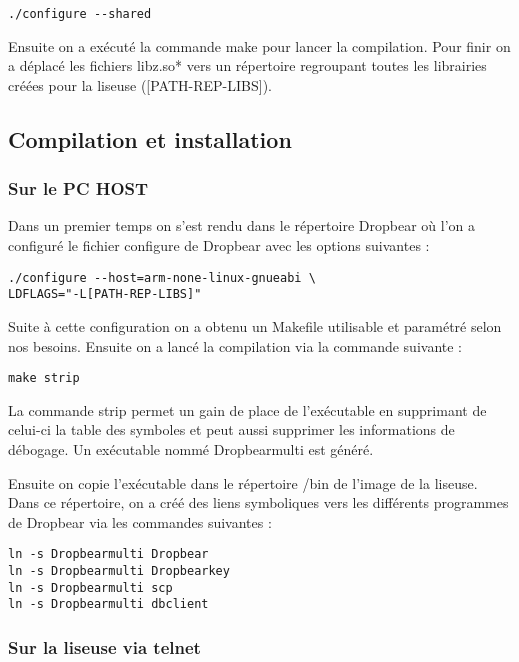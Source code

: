 \begin{lstlisting}
./configure --shared
\end{lstlisting}

Ensuite on a exécuté la commande make pour lancer la compilation.
Pour finir on a déplacé les fichiers libz.so* vers un répertoire regroupant toutes les librairies créées pour la liseuse ([PATH-REP-LIBS]). 

\subsection{Compilation et installation}

\subsubsection{Sur le PC HOST}

Dans un premier temps on s'est rendu dans le répertoire Dropbear où l'on a configuré le fichier configure de Dropbear avec les options suivantes :

\begin{lstlisting}
./configure --host=arm-none-linux-gnueabi \
LDFLAGS="-L[PATH-REP-LIBS]"
\end{lstlisting} 

Suite à cette configuration on a obtenu un Makefile utilisable et paramétré selon nos besoins.
Ensuite on a lancé la compilation via la commande suivante :

\begin{lstlisting}
make strip
\end{lstlisting}

La commande strip permet un gain de place de l'exécutable en supprimant de celui-ci la table des symboles et peut aussi supprimer les informations de débogage. Un exécutable nommé Dropbearmulti est généré.

Ensuite on copie l'exécutable dans le répertoire /bin de l'image de la liseuse. Dans ce répertoire, on a créé des liens symboliques vers les différents programmes de Dropbear via les commandes suivantes :

\begin{lstlisting}
ln -s Dropbearmulti Dropbear
ln -s Dropbearmulti Dropbearkey
ln -s Dropbearmulti scp
ln -s Dropbearmulti dbclient
\end{lstlisting}  

\subsubsection{Sur la liseuse via telnet}

